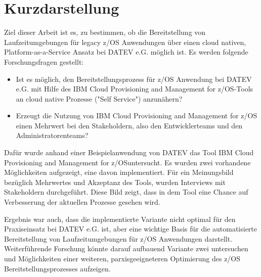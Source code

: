 \thispagestyle{empty}
\section*{Kurzdarstellung}
\label{sec:kurzdarstellung}
Ziel dieser Arbeit ist es, zu bestimmen, ob die Bereitstellung von Laufzeitumgebungen für legacy z/OS Anwendungen über einen cloud nativen, Platform-as-a-Service Ansatz bei DATEV e.G. möglich ist.
Es werden folgende Forschungsfragen gestellt:
\begin{itemize}
\item Ist es möglich, den Bereitstellungsprozess für z/OS Anwendung bei DATEV e.G. mit Hilfe des \glqq IBM Cloud Provisioning and Management for z/OS\grqq-Tools an cloud native Prozesse ("Self Service") anzunähern?
\item Erzeugt die Nutzung von \glqq IBM Cloud Provisioning and Management for z/OS\grqq{} einen Mehrwert bei den Stakeholdern, also den Entwicklerteams und den Administratorenteams?
\end{itemize}

Dafür wurde anhand einer Beispielanwendung von DATEV das Tool \glqq IBM Cloud Provisioning and Management for z/OS\grqq untersucht.
Es wurden zwei vorhandene Möglichkeiten aufgezeigt, eine davon implementiert.
Für ein Meinungsbild bezüglich  Mehrwertes und Akzeptanz des Tools, wurden Interviews mit Stakeholdern durchgeführt.
Diese Bild zeigt, dass in dem Tool eine Chance auf Verbesserung der aktuellen Prozesse gesehen wird.

Ergebnis war auch, dass die implementierte Variante nicht optimal für den Praxiseinsatz bei DATEV e.G. ist, aber eine wichtige Basis für die automatisierte Bereitstellung von Laufzeitumgebungen für z/OS Anwendungen darstellt.
Weiterführende Forschung könnte darauf aufbauend Variante zwei untersuchen und  Möglichkeiten einer weiteren, parxisgeeigneteren  Optimierung des z/OS Bereitstellungsprozesses aufzeigen.



